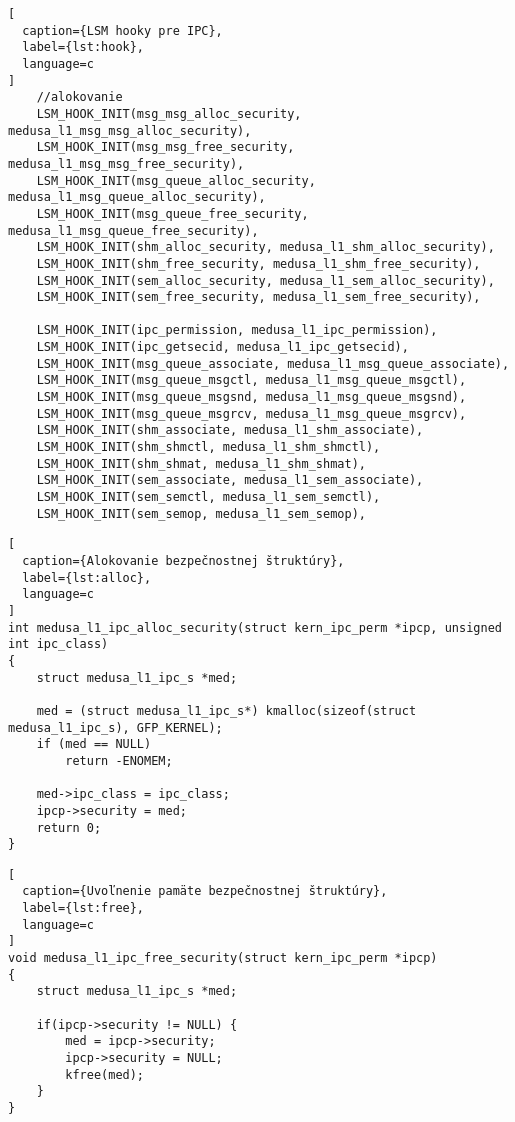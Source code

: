 \begin{lstlisting}[
  caption={LSM hooky pre IPC},
  label={lst:hook},
  language=c
]
	//alokovanie
	LSM_HOOK_INIT(msg_msg_alloc_security, medusa_l1_msg_msg_alloc_security),
	LSM_HOOK_INIT(msg_msg_free_security, medusa_l1_msg_msg_free_security),
	LSM_HOOK_INIT(msg_queue_alloc_security, medusa_l1_msg_queue_alloc_security),
	LSM_HOOK_INIT(msg_queue_free_security, medusa_l1_msg_queue_free_security),
	LSM_HOOK_INIT(shm_alloc_security, medusa_l1_shm_alloc_security),
	LSM_HOOK_INIT(shm_free_security, medusa_l1_shm_free_security),
	LSM_HOOK_INIT(sem_alloc_security, medusa_l1_sem_alloc_security),
	LSM_HOOK_INIT(sem_free_security, medusa_l1_sem_free_security),

	LSM_HOOK_INIT(ipc_permission, medusa_l1_ipc_permission),
	LSM_HOOK_INIT(ipc_getsecid, medusa_l1_ipc_getsecid),	
	LSM_HOOK_INIT(msg_queue_associate, medusa_l1_msg_queue_associate),
	LSM_HOOK_INIT(msg_queue_msgctl, medusa_l1_msg_queue_msgctl),
	LSM_HOOK_INIT(msg_queue_msgsnd, medusa_l1_msg_queue_msgsnd),
	LSM_HOOK_INIT(msg_queue_msgrcv, medusa_l1_msg_queue_msgrcv),
	LSM_HOOK_INIT(shm_associate, medusa_l1_shm_associate),
	LSM_HOOK_INIT(shm_shmctl, medusa_l1_shm_shmctl),
	LSM_HOOK_INIT(shm_shmat, medusa_l1_shm_shmat),
	LSM_HOOK_INIT(sem_associate, medusa_l1_sem_associate),
	LSM_HOOK_INIT(sem_semctl, medusa_l1_sem_semctl),
	LSM_HOOK_INIT(sem_semop, medusa_l1_sem_semop),
\end{lstlisting}
\begin{lstlisting}[
  caption={Alokovanie bezpečnostnej štruktúry},
  label={lst:alloc},
  language=c
]
int medusa_l1_ipc_alloc_security(struct kern_ipc_perm *ipcp, unsigned int ipc_class)
{
	struct medusa_l1_ipc_s *med;

	med = (struct medusa_l1_ipc_s*) kmalloc(sizeof(struct medusa_l1_ipc_s), GFP_KERNEL);
	if (med == NULL)
		return -ENOMEM;

	med->ipc_class = ipc_class;
	ipcp->security = med;
	return 0;
}
\end{lstlisting}
\begin{lstlisting}[
  caption={Uvoľnenie pamäte bezpečnostnej štruktúry},
  label={lst:free},
  language=c
]
void medusa_l1_ipc_free_security(struct kern_ipc_perm *ipcp)
{
	struct medusa_l1_ipc_s *med;
	
	if(ipcp->security != NULL) {
		med = ipcp->security;
		ipcp->security = NULL;
		kfree(med);
	}
}
\end{lstlisting}